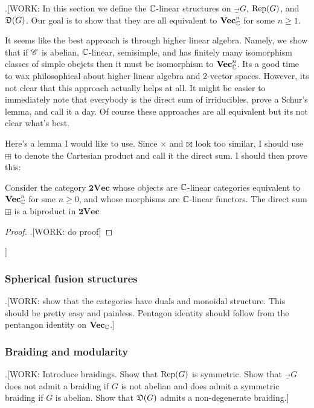 .[WORK: In this section we define the $\mathbb{C}$-linear structures on $\Vec_G$, $\operatorname{Rep}(G)$, and $\mathfrak{D}(G)$. Our goal is to show that they are all equivalent to $\mathbf{Vec}_{\mathbb{C}}^n$ for some $n\geq 1$.

It seems like the best approach is through higher linear algebra. Namely, we show that if $\mathscr{C}$ is abelian, $\mathbb{C}$-linear, semisimple, and has finitely many isomorphism classes of simple obejcts then it must be isomorphism to $\mathbf{Vec}_{\mathbb{C}}^n$. Its a good time to wax philosophical about higher linear algebra and 2-vector spaces. However, its not clear that this approach actually helps at all. It might be easier to immediately note that everybody is the direct sum of irriducibles, prove a Schur's lemma, and call it a day. Of course these approaches are all equivalent but its not clear what's best.


Here's a lemma I would like to use. Since $\times$ and $\boxtimes$ look too similar, I should use $\boxplus$ to denote the Cartesian product and call it the direct sum. I should then prove this:

\begin{lemma} Consider the category $\mathrm{\textbf{2Vec}}$ whose objects are $\mathbb{C}$-linear categories equivalent to $\mathbf{Vec}_{\mathbb{C}}^n$ for sme $n\geq 0$, and whose morphisms are $\mathbb{C}$-linear functors. The direct sum $\boxplus$ is a biproduct in $\mathrm{\textbf{2Vec}}$
\end{lemma}
\begin{proof} .[WORK: do proof]
\end{proof}
]

\subsubsection{Spherical fusion structures}

.[WORK: show that the categories have duals and monoidal structure. This should be pretty easy and painless. Pentagon identity should follow from the pentangon identity on $\mathbf{Vec}_{\mathbb{C}}$.]

\subsubsection{Braiding and modularity}

.[WORK: Introduce braidings. Show that $\operatorname{Rep}(G)$ is symmetric. Show that $\Vec_G$ does not admit a braiding if $G$ is not abelian and does admit a symmetric braiding if $G$ is abelian. Show that $\mathfrak{D}(G)$ admits a non-degenerate braiding.]


